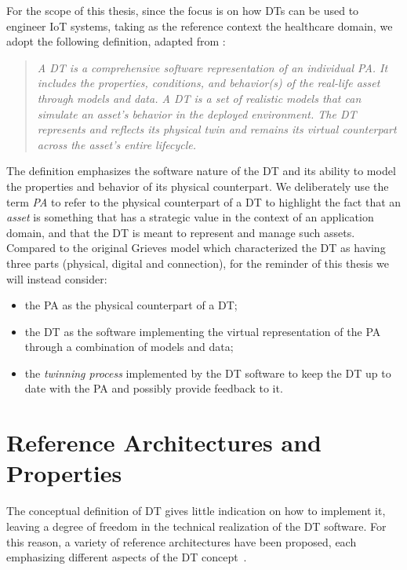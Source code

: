 For the scope of this thesis, 
since the focus is on how \acp{DT} can be used to engineer \ac{IoT} systems, taking as the reference context the healthcare domain,
we adopt the following definition, adapted from \cite{dt-IoT-context-Minerva-2020}:

\begin{quote}
\emph{
A \acf{DT} is a comprehensive software representation of an individual \acl{PA}.
It includes the properties, conditions, and behavior(s) of the real-life asset through models and data.
A \ac{DT} is a set of realistic models that can simulate an asset's behavior in the deployed environment.
The \ac{DT} represents and reflects its physical twin and remains its virtual counterpart across the asset's entire lifecycle.
}
\end{quote}

The definition emphasizes the software nature of the \ac{DT} and its ability to model the properties and behavior of its physical counterpart.
%
We deliberately use the term \emph{\ac{PA}} to refer to the physical counterpart of a \ac{DT}
to highlight the fact that an \emph{asset} is something that has a strategic
value in the context of an application domain, and that the \ac{DT} is meant to represent and manage such assets.
%
Compared to the original Grieves model which characterized the \ac{DT} as having three parts (physical, digital and connection), for the reminder of this thesis we will instead consider:
\begin{itemize}
\item the \ac{PA} as the physical counterpart of a \ac{DT};
\item the \ac{DT} as the software implementing the virtual representation of the \ac{PA} through a combination of models and data;
\item the \emph{twinning process} implemented by the \ac{DT} software to keep the \ac{DT} up to date with the \ac{PA} and possibly provide feedback to it.
\end{itemize}

\section{Reference Architectures and Properties}

The conceptual definition of \ac{DT} gives little indication on how to implement it,
leaving a degree of freedom in the technical realization of the \ac{DT} software.
%
For this reason, a variety of reference architectures have been proposed, 
each emphasizing different aspects of the \ac{DT} concept~\cite{ferko2022architecting}.

